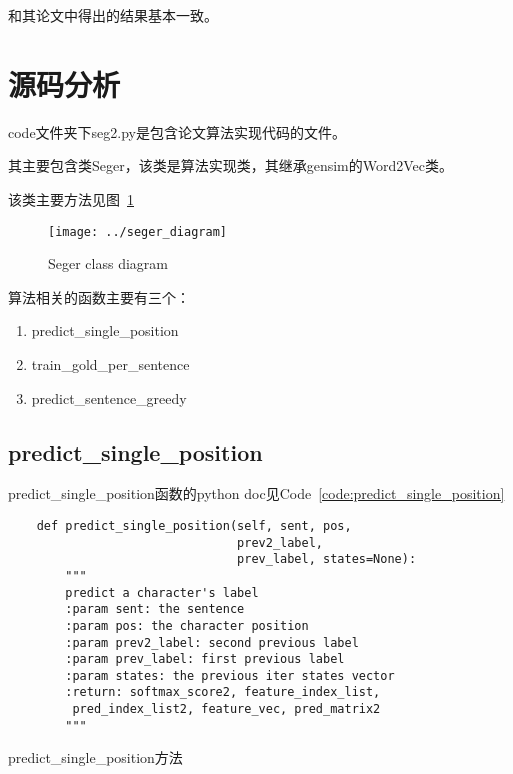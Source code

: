 \documentclass[]{article}
\begin{document}
和其论文中得出的结果基本一致。

\section{源码分析}

code文件夹下seg2.py是包含论文算法实现代码的文件。

其主要包含类Seger，该类是算法实现类，其继承gensim的Word2Vec类。

该类主要方法见图~\ref{fig:seger_diagram}

\begin{figure}
\centering
\texttt{[image: ../seger\_diagram]}
\caption{Seger class diagram}
\label{fig:seger_diagram}
\end{figure}

算法相关的函数主要有三个：
\begin{enumerate}
\item predict\_single\_position
\item train\_gold\_per\_sentence
\item predict\_sentence\_greedy
\end{enumerate}

\renewcommand\listingscaption{Code}

\subsection{predict\_single\_position}

predict\_single\_position函数的python doc见Code~\ref{code:predict_single_position}
\begin{listing}[H]
\begin{verbatim}
    def predict_single_position(self, sent, pos,
                                prev2_label,
                                prev_label, states=None):
        """
        predict a character's label
        :param sent: the sentence
        :param pos: the character position
        :param prev2_label: second previous label
        :param prev_label: first previous label
        :param states: the previous iter states vector
        :return: softmax_score2, feature_index_list,
         pred_index_list2, feature_vec, pred_matrix2
        """
\end{verbatim}
\caption{predict\_single\_position方法}
\label{code:predict_single_position}
\end{listing}
\end{document}
